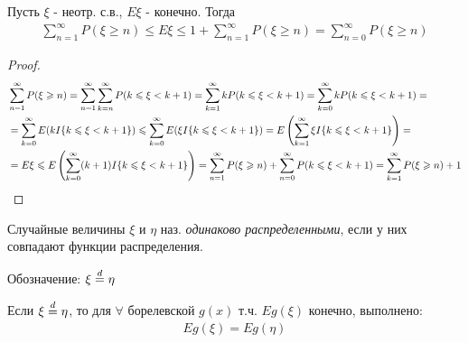 
\begin{lemma}
  Пусть $\xi$ - неотр. с.в., $E\xi$ - конечно.
  Тогда
  \begin{align*}
    \sum_{n = 1}^{\infty} P(\xi \geq n) \leq E \xi \leq 1 + \sum_{n = 1}^{\infty} P(\xi \geq n) = 
    \sum_{n = 0}^{\infty} P(\xi \geq n)
  \end{align*}
\end{lemma}


\begin{proof}
  \begin{align*}
    &\sum_{n = 1}^{\infty} P(\xi \geqslant n)
    = \sum_{n = 1}^{\infty} \sum_{k = n}^{\infty} P(k \leqslant \xi < k + 1)
    = \sum_{k = 1}^{\infty} k P(k \leqslant \xi < k + 1) 
    = \sum_{k = 0}^{\infty} k P(k \leqslant \xi < k + 1) =\\
    &= \sum_{k = 0}^{\infty} E(k I \{ k \leqslant \xi < k + 1 \}) 
    \leqslant \sum_{k = 0}^{\infty} E(\xi I \{ k \leqslant \xi < k + 1 \})
    = E \left( \sum_{k = 1}^{\infty} \xi I \{ k \leqslant \xi < k + 1 \} \right) = \\
    &= E \xi \leqslant E\left( \sum_{k = 0}^{\infty} (k + 1) I \{ k \leqslant \xi < k + 1 \} \right)
    = \sum_{n = 1}^{\infty} P(\xi \geqslant n) + \sum_{n = 0}^{\infty} P(k \leqslant \xi < k + 1)  
    = \sum_{k = 1}^{\infty} P(\xi \geqslant n) + 1
  \end{align*}
\end{proof}

\begin{definition}
  Случайные величины $\xi$ и $\eta$ наз. \emph{одинаково распределенными}, 
  если у них совпадают функции распределения. 

  Обозначение: $\xi \stackrel{d}{=} \eta$
\end{definition}

\begin{statement}
  Если $\xi \stackrel{d}{=} \eta$, то для $\forall$ борелевской $g(x)$ т.ч. 
  $E g(\xi)$ конечно, выполнено:
  \begin{align*}
    E g(\xi) = E g(\eta)
  \end{align*}
\end{statement}

